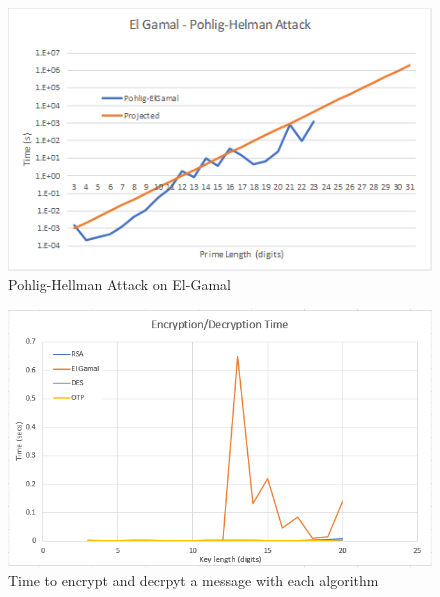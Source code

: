 \documentclass[12pt]{report}
\begin{document}
\begin{figure}[hp!] %
    \begin{center}
        \includegraphics[width=0.85\linewidth]{ElGamalPohlig.PNG}
        \caption{Pohlig-Hellman Attack on El-Gamal}
        \label{fig:el-gamal3}
    \end{center}
\end{figure}

\begin{figure}[hp!] %
    \begin{center}
        \includegraphics[width=0.85\linewidth]{TransferBenchmarks.png}
        \caption{Time to encrypt and decrpyt a message with each algorithm}
        \label{fig:TransferBenchmarks}
    \end{center}
\end{figure}
\FloatBarrier
\end{document}
